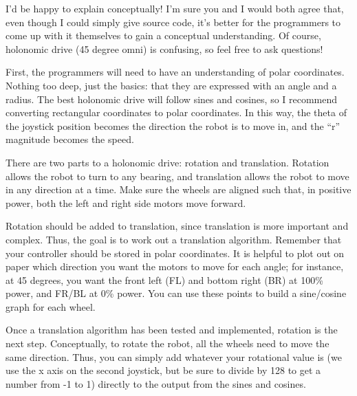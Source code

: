\begin{fancyquotes}
I'd be happy to explain conceptually! I'm sure you and I would both agree that, even though I could simply give source code, it's better for the programmers to come up with it themselves to gain a conceptual understanding. Of course, holonomic drive (45 degree omni) is confusing, so feel free to ask questions!\newline\newline

First, the programmers will need to have an understanding of polar coordinates. Nothing too deep, just the basics: that they are expressed with an angle and a radius. The best holonomic drive will follow sines and cosines, so I recommend converting rectangular coordinates to polar coordinates. In this way, the theta of the joystick position becomes the direction the robot is to move in, and the ``r'' magnitude becomes the speed.\newline\newline

There are two parts to a holonomic drive: rotation and translation. Rotation allows the robot to turn to any bearing, and translation allows the robot to move in any direction at a time. Make sure the wheels are aligned such that, in positive power, both the left and right side motors move forward.\newline\newline

Rotation should be added to translation, since translation is more important and complex. Thus, the goal is to work out a translation algorithm. Remember that your controller should be stored in polar coordinates. It is helpful to plot out on paper which direction you want the motors to move for each angle; for instance, at 45 degrees, you want the front left (FL) and bottom right (BR) at 100\% power, and FR/BL at 0\% power. You can use these points to build a sine/cosine graph for each wheel. \newline\newline

Once a translation algorithm has been tested and implemented, rotation is the next step. Conceptually, to rotate the robot, all the wheels need to move the same direction. Thus, you can simply add whatever your rotational value is (we use the x axis on the second joystick, but be sure to divide by 128 to get a number from -1 to 1) directly to the output from the sines and cosines.\newline\newline


\end{fancyquotes}
